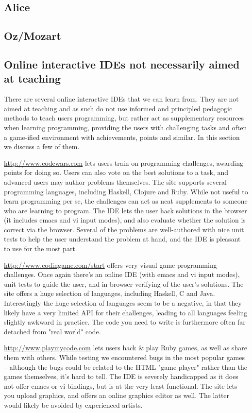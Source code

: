 \subsection{Alice}

\subsection{Oz/Mozart}

\subsection{Online interactive IDEs not necessarily aimed at teaching}
There are several online interactive IDEs that we can learn from. They are not 
aimed at teaching and as such do not use informed and principled pedagogic 
methods to teach users programming, but rather act as supplementary resources 
when learning programming, providing the users with challenging tasks and 
often a game-ified environment with achievements, points and similar. In this 
section we discuss a few of them.

\url{http://www.codewars.com} lets users train on programming challenges, 
awarding points for doing so. Users can also vote on the best solutions to a 
task, and advanced users may author problems themselves. The site supports 
several programming languages, including Haskell, Clojure and Ruby. While not 
useful to learn programming per se, the challenges can act as neat supplements 
to someone who are learning to program. The IDE lets the user hack solutions 
in the browser (it includes emacs and vi input modes), and also evaluate 
whether the solution is correct via the browser. Several of the problems are 
well-authored with nice unit tests to help the user understand the problem at 
hand, and the IDE is pleasant to use for the most part.

\url{http://www.codingame.com/start} offers very visual game programming 
challenges. Once again there's an online IDE (with emacs and vi input modes), 
unit tests to guide the user, and in-browser verifying of the user's 
solutions. The site offers a huge selection of languages, including Haskell, C 
and Java. Interestingly the huge selection of languages seem to be a negative, 
in that they likely have a very limited API for their challenges, leading to 
all languages feeling slightly awkward in practice. The code you need to write 
is furthermore often far detached from "real world" code.

\url{http://www.playmycode.com} lets users hack \& play Ruby games, as well as 
share them with others. While testing we encountered bugs in the most popular 
games -- although the bugs could be related to the HTML "game player" rather 
than the games themselves, it's hard to tell. The IDE is severely handicapped 
as it does not offer emacs or vi bindings, but is at the very least 
functional. The site lets you upload graphics, and offers an online graphics 
editor as well. The latter would likely be avoided by experienced artists.

